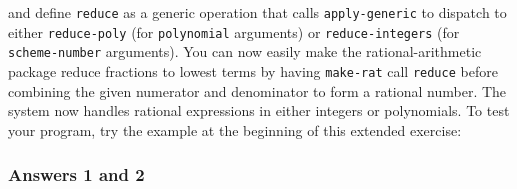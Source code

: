 \documentclass[final,fleqn,titlepage,twoside]{article}
\begin{document}
\begin{enumerate}
and define \texttt{reduce} as a generic operation that calls
\texttt{apply-generic} to dispatch to either \texttt{reduce-poly} (for
\texttt{polynomial} arguments) or \texttt{reduce-integers} (for
\texttt{scheme-number} arguments). You can now easily make the
rational-arithmetic package reduce fractions to lowest terms by having
\texttt{make-rat} call \texttt{reduce} before combining the given
numerator and denominator to form a rational number. The system now handles
rational expressions in either integers or polynomials. To test your program,
try the example at the beginning of this extended exercise:
\end{enumerate}

\subsubsection{Answers 1 and 2}
\label{sec:org02cc174}
\end{document}
